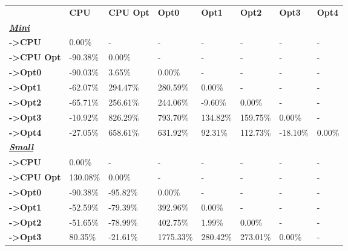 \begin{table}[H]
    \centering
    \begin{tabular}{llllllll}
    \rowcolor[HTML]{DAE8FC} \ &  \textbf{CPU} &  \textbf{CPU Opt} &  \textbf{Opt0} &  \textbf{Opt1} &  \textbf{Opt2} &  \textbf{Opt3} &  \textbf{Opt4} \\
    \cellcolor[HTML]{DAE8FC} \textbf{\textbf{{\emph{{\underline{{Mini}}}}}}} &  &  &  &  &  &  &  \\
    \rowcolor[HTML]{EFEFEF} \cellcolor[HTML]{DAE8FC} \textbf{->CPU} & 0.00\% & - & - & - & - & - & - \\
    \cellcolor[HTML]{DAE8FC} \textbf{->CPU Opt} & -90.38\% & 0.00\% & - & - & - & - & - \\
    \rowcolor[HTML]{EFEFEF} \cellcolor[HTML]{DAE8FC} \textbf{->Opt0} & -90.03\% & 3.65\% & 0.00\% & - & - & - & - \\
    \cellcolor[HTML]{DAE8FC} \textbf{->Opt1} & -62.07\% & 294.47\% & 280.59\% & 0.00\% & - & - & - \\
    \rowcolor[HTML]{EFEFEF} \cellcolor[HTML]{DAE8FC} \textbf{->Opt2} & -65.71\% & 256.61\% & 244.06\% & -9.60\% & 0.00\% & - & - \\
    \cellcolor[HTML]{DAE8FC} \textbf{->Opt3} & -10.92\% & 826.29\% & 793.70\% & 134.82\% & 159.75\% & 	0.00\% & - \\
    \rowcolor[HTML]{EFEFEF} \cellcolor[HTML]{DAE8FC} \textbf{->Opt4} & -27.05\% & 658.61\% & 631.92\% & 92.31\% & 112.73\% & 	-18.10\% & 	0.00\% \\
    \cellcolor[HTML]{DAE8FC} \textbf{\textbf{{\emph{{\underline{{Small}}}}}}} &  &  &  &  &  &  &  \\
    \rowcolor[HTML]{EFEFEF} \cellcolor[HTML]{DAE8FC} \textbf{->CPU} & 0.00\% & - & - & - & - & - & - \\
    \cellcolor[HTML]{DAE8FC} \textbf{->CPU Opt} & 130.08\% & 0.00\% & - & - & - & - & - \\
    \rowcolor[HTML]{EFEFEF} \cellcolor[HTML]{DAE8FC} \textbf{->Opt0} & -90.38\% & -95.82\% & 0.00\% & - & - & - & - \\
    \cellcolor[HTML]{DAE8FC} \textbf{->Opt1} & -52.59\% & -79.39\% & 392.96\% & 0.00\% & - & - & - \\
    \rowcolor[HTML]{EFEFEF} \cellcolor[HTML]{DAE8FC} \textbf{->Opt2} & -51.65\% & -78.99\% & 402.75\% & 1.99\% & 0.00\% & - & - \\
    \cellcolor[HTML]{DAE8FC} \textbf{->Opt3} & 80.35\% & -21.61\% & 1775.33\% & 280.42\% & 273.01\% & 	0.00\% & - \\

\end{tabular}
\end{table}
